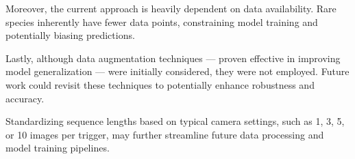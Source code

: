 Moreover, the current approach is heavily dependent on data availability.
Rare species inherently have fewer data points, constraining model training and potentially biasing predictions.

Lastly, although data augmentation techniques --- proven effective in improving model generalization \autocite{shortenSurveyImageData2019} --- were initially considered, they were not employed.
Future work could revisit these techniques to potentially enhance robustness and accuracy.

Standardizing sequence lengths based on typical camera settings, such as 1, 3, 5, or 10 images per trigger, may further streamline future data processing and model training pipelines.
